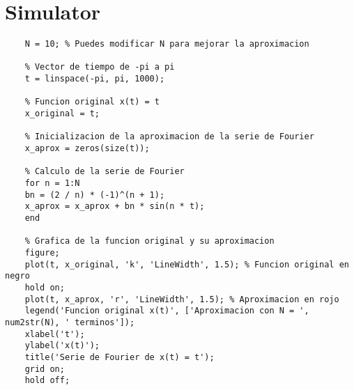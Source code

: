 
\chapter{Simulator}\label{app:Simulator}

\begin{lstlisting}[style=Matlab-editor]
	% Numero de terminos en la serie de Fourier
	N = 10; % Puedes modificar N para mejorar la aproximacion
	
	% Vector de tiempo de -pi a pi
	t = linspace(-pi, pi, 1000);
	
	% Funcion original x(t) = t
	x_original = t;
	
	% Inicializacion de la aproximacion de la serie de Fourier
	x_aprox = zeros(size(t));
	
	% Calculo de la serie de Fourier
	for n = 1:N
	bn = (2 / n) * (-1)^(n + 1);
	x_aprox = x_aprox + bn * sin(n * t);
	end
	
	% Grafica de la funcion original y su aproximacion
	figure;
	plot(t, x_original, 'k', 'LineWidth', 1.5); % Funcion original en negro
	hold on;
	plot(t, x_aprox, 'r', 'LineWidth', 1.5); % Aproximacion en rojo
	legend('Funcion original x(t)', ['Aproximacion con N = ', num2str(N), ' terminos']);
	xlabel('t');
	ylabel('x(t)');
	title('Serie de Fourier de x(t) = t');
	grid on;
	hold off;
	
\end{lstlisting}
	
